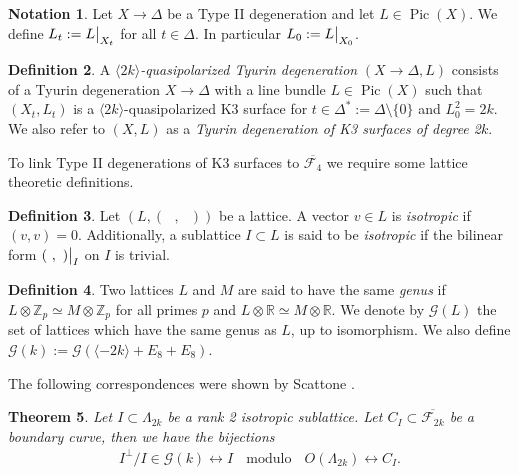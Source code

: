 \documentclass[a4paper]{amsart}
\theoremstyle{definition}
\newtheorem{defn}{Definition}[section]
\newtheorem{notation}[defn]{Notation}
\theoremstyle{plain}
\newtheorem{theorem}[defn]{Theorem}
\theoremstyle{remark}
\newcommand{\Z}{\mathbb{Z}}
\newcommand{\R}{\mathbb{R}}
\begin{document}
\begin{notation}\label{not: restriction of line bundle on a degeneration}
Let $X\rightarrow\Delta$ be a Type II degeneration and let $L \in \operatorname{Pic}(X)$. We define $L_t:=L\big{|}_{X_t}$ for all $t \in \Delta$. In particular $L_0:=L\big{|}_{X_0}$.
\end{notation}

\begin{defn}
A \emph{$\langle 2k \rangle$-quasipolarized Tyurin degeneration} $(X\rightarrow \Delta, L)$ consists of a Tyurin degeneration $X\rightarrow \Delta$ with a line bundle $L \in \operatorname{Pic}(X)$ such that $(X_t,L_t)$ is a $\langle 2k\rangle$-quasipolarized K3 surface for $t \in \Delta^*:=\Delta\setminus\{0\}$ and $L_0^2=2k$. We also refer to $(X,L)$ as a \emph{Tyurin degeneration of K3 surfaces of degree 2$k$}. 
\end{defn}

To link Type II degenerations of K3 surfaces to $\overline{\mathcal{F}_{4}}$ we require some lattice theoretic definitions. 

\begin{defn}
Let $(L, ( \text{ },\text{ }))$ be a lattice. A vector $v \in L$ is \emph{isotropic} if $(v,v)=0$. Additionally, a sublattice $I \subset L$ is said to be \emph{isotropic} if the bilinear form $( \text{ },\text{ })\big{|}_I$ on $I$ is trivial.
\end{defn} 

\begin{defn}
Two lattices $L$ and $M$ are said to have the same \emph{genus} if $L\otimes\Z_p\simeq M\otimes\Z_p$ for all primes $p$ and $L\otimes\R\simeq M\otimes \R$. We denote by $\mathscr{G}(L)$ the set of lattices which have the same genus as $L$, up to isomorphism. We also define $\mathscr{G}(k):=\mathscr{G}(\langle -2k\rangle +E_8+ E_8)$.
\end{defn}

The following correspondences were shown by Scattone \cite{Sca87}.

\begin{theorem}
\cite[5.4.7]{Sca87} Let $I \subset \Lambda_{2k}$ be a rank 2 isotropic sublattice. Let $C_I \subset \overline{\mathcal{F}_{2k}}$ be a boundary curve, then we have the bijections
\begin{align*}
 I^\perp/I \in \mathscr{G}(k)\leftrightarrow I \text{ } \operatorname{modulo} \text{ }O(\Lambda_{2k}) \leftrightarrow C_I.
\end{align*}
\end{theorem}
\end{document}
